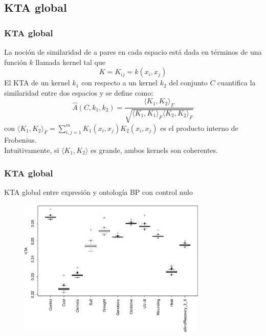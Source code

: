 \documentclass[serif,9pt, t]{beamer}
\begin{document}
\subsection{KTA global}
\begin{frame}\frametitle{KTA global} 
La noción de similaridad de a pares en cada espacio está dada en términos de una función $k$ llamada kernel tal que
\begin{equation}
	K = K_{ij} = k(x_i, x_j)
\end{equation}
\bigskip
El KTA de un kernel $k_1$ con respecto a un kernel $k_2$ del conjunto $C$ cuantifica la similaridad entre dos espacios y se define como:
\begin{equation}
	\hat{A}(C, k_1, k_2) = \frac{\langle K_1, K_2 \rangle _F}{\sqrt{\langle K_1, K_1 \rangle _F \langle K_2, K_2 \rangle _F}}
\end{equation}
con $\langle K_1, K_2 \rangle _F = \sum_{i,j=1}^m K_1(x_i, x_j)K_2(x_i, x_j)$ es el producto interno de Frobenius.\\
Intuitivamente, si $\langle K_1, K_2 \rangle$ es grande, ambos kernels son coherentes.
\end{frame}

\begin{frame}\frametitle{KTA global} 
\centering
KTA global entre expresión y ontología BP con control nulo
\begin{figure}
    	\centering
	\includegraphics[width=0.8\textwidth]{kta_global_bpb.pdf}
\end{figure}
\centering
\end{frame}
\end{document}
